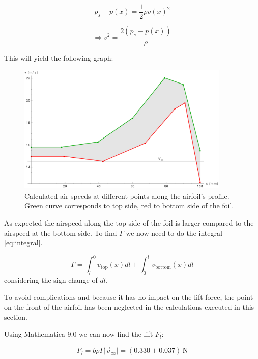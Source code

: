 \documentclass{scrreprt}
\newcommand{\unit}[1]{\ensuremath{\, \mathrm{#1}}}
\begin{document}
\begin{equation}
p_s - p(x) = \frac{1}{2} \rho v(x)^2
\end{equation}


\begin{equation}
\Longrightarrow v^2 = \frac{2\left(p_s-p(x)\right)}{\rho}
\end{equation}

This will yield the following graph:

\begin{figure}[H]
	\centering
  \includegraphics[width=0.9\textwidth]{diag/kutta-joukowsky.pdf}
	\caption{Calculated air speeds at different points along the airfoil's profile. Green curve corresponds to top side, red to bottom side of the foil.}
	\label{fig:kutta}
\end{figure}

As expected the airspeed along the top side of the foil is larger compared to the airspeed at the bottom side. To find $\Gamma$ we now need to do the integral \ref{eq:integral}.

\begin{equation}
\Gamma = \int_l^0 v_{\text{top}}(x) dl + \int_0^l v_{\text{bottom}}(x) dl
\end{equation}
considering the sign change of $dl$.

To avoid complications and because it has no impact on the lift force, the point on the front of the airfoil has been neglected in the calculations executed in this section.

Using Mathematica 9.0 we can now find the lift $F_l$:

\begin{equation}
F_l = b \rho \Gamma \lvert \vec{v}_\infty \rvert = (0.330 \pm 0.037) \unit{N}
\end{equation}
\end{document}
